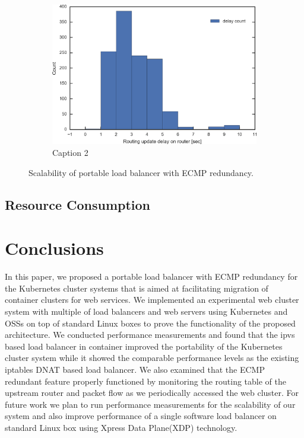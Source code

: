 \begin{figure}[tb]
  \par\bigskip

  \begin{subfigure}[t]{\columnwidth}
    \includegraphics[width=0.9\columnwidth,left]{Figs/ecmp_delay_histgram_ieice}
    \caption{Caption 2}
    \label{fig:ecmp_delay_histgram_ieice}
  \end{subfigure}

  \caption{Scalability of portable load balancer with ECMP redundancy.}
  \label{fig:ecmp_delay_histgram_ieice}

\end{figure}

\subsection{Resource Consumption}



\section{Conclusions}\label{Conclusions}

In this paper, we proposed a portable load balancer with ECMP redundancy for the Kubernetes cluster systems that is aimed at facilitating migration of container clusters for web services.
We implemented an experimental web cluster system with multiple of load balancers and web servers using Kubernetes and OSSs on top of standard Linux boxes to prove the functionality of the proposed architecture.
We conducted performance measurements and found that the ipvs based load balancer in container improved the portability of 
the Kubernetes cluster system while it showed the comparable performance levels as the existing iptables DNAT based load balancer.
We also examined that the ECMP redundant feature properly functioned by monitoring the routing table of the upstream router and packet flow as we periodically accessed the web cluster.
For future work we plan to run performance measurements for the scalability of our system and also improve performance of a single software load balancer on standard Linux box using Xpress Data Plane(XDP) technology. 



